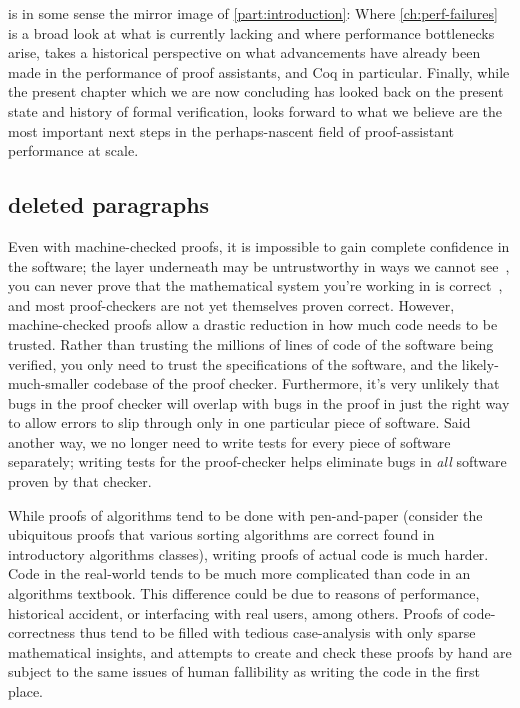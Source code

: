  is in some sense the mirror image of \autoref{part:introduction}:
Where \autoref{ch:perf-failures} is a broad look at what is currently lacking and where performance bottlenecks arise,  takes a historical perspective on what advancements have already been made in the performance of proof assistants, and Coq in particular.
Finally, while the present chapter which we are now concluding has looked back on the present state and history of formal verification,  looks forward to what we believe are the most important next steps in the perhaps-nascent field of proof-assistant performance at scale.


\begin{subappendices}

\begin{minorcomment}
\section{deleted paragraphs}

Even with machine-checked proofs, it is impossible to gain complete confidence in the software; the layer underneath may be untrustworthy in ways we cannot see~\cite{Reflections1984Thompson}, you can never prove that the mathematical system you're working in is correct~\cite{sep-goedel-incompleteness}, and most proof-checkers are not yet themselves proven correct.
However, machine-checked proofs allow a drastic reduction in how much code needs to be trusted.
Rather than trusting the millions of lines of code of the software being verified, you only need to trust the specifications of the software, and the likely-much-smaller codebase of the proof checker.
Furthermore, it's very unlikely that bugs in the proof checker will overlap with bugs in the proof in just the right way to allow errors to slip through only in one particular piece of software.
Said another way, we no longer need to write tests for every piece of software separately; writing tests for the proof-checker helps eliminate bugs in \emph{all} software proven by that checker.

While proofs of algorithms tend to be done with pen-and-paper (consider the ubiquitous proofs that various sorting algorithms are correct found in introductory algorithms classes), writing proofs of actual code is much harder.
Code in the real-world tends to be much more complicated than code in an algorithms textbook.
This difference could be due to reasons of performance, historical accident, or interfacing with real users, among others.
Proofs of code-correctness thus tend to be filled with tedious case-analysis with only sparse mathematical insights, and attempts to create and check these proofs by hand are subject to the same issues of human fallibility as writing the code in the first place.


\end{minorcomment}
\end{subappendices}
